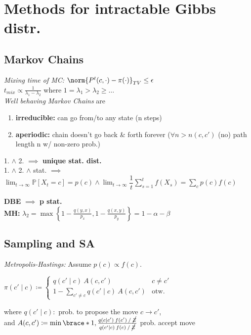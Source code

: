 \section{Methods for intractable Gibbs distr.}

\subsection{Markov Chains}
\emph{Mixing time of MC:} $\norm{P^t(c, \cdot) - \pi(\cdot)}_{TV} \leq \epsilon$\\
$t_{mix}\propto \frac{1}{\lambda_1 - \lambda_2}$ where $1=\lambda_1 > \lambda_2 \geq \ldots$ \\
\textit{Well behaving} \emph{Markov Chains} are
\begin{enumerate}
    \item \textbf{irreducible:} can go from/to any state (n steps)
    \item \textbf{aperiodic:} chain doesn't go back \& forth forever ($\forall n>n(c, c')$ (no) path length n w/ non-zero prob.)
\end{enumerate}

1. $\wedge$ 2. $\implies$ \textbf{unique stat. dist.} \\
1. $\wedge$ 2. $\wedge$ stat. $\implies$ $\lim_{t\rightarrow \infty}\mathbb{P}[X_t=c]= p(c)\wedge\lim_{t\rightarrow\infty}\dfrac{1}{t}\sum_{s=1}^tf(X_s)=\sum_c p(c)f(c)$

\textbf{DBE} $\implies$ \textbf{p stat.}\\
\textbf{MH:} $\lambda_2=\max\left\{1-\frac{q(y, x)}{p_x}, 1-\frac{q(x, y)}{p_y}\right\}=1-\alpha-\beta$

\subsection{Sampling and SA}

\emph{Metropolis-Hastings:}
Assume $p(c) \propto f(c)$.

$\pi(c'\mid c) \coloneqq
\begin{cases}
    q(c'\mid c) \: A(c,c') & c\neq c'\\
    1 - \sum_{c'\neq c} q(c'\mid c) \: A(c,c') & \text{otw.}
\end{cases}$

where\enskip
$q(c'\mid c) :$ prob. to propose the move $c \to c'$,\\
and\enskip
$A(c,c') \coloneqq \min\brace*{ 1, \frac{q(c\mid c') \: f(c') \: / \: \cancel{Z}}{q(c'\mid c) \: f(c) \: / \: \cancel{Z}} }$ prob. accept move

